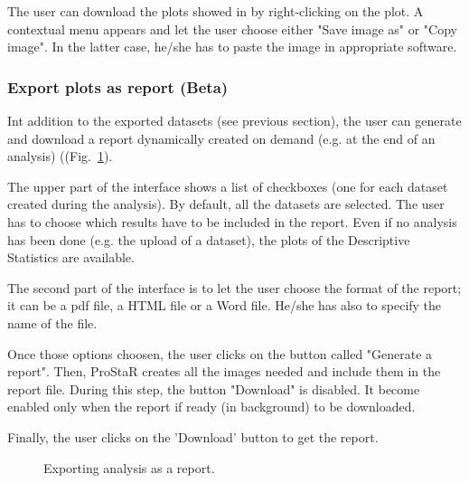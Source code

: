 \documentclass[12pt]{article}
\begin{document}
{{The user can download the plots showed in  by 
right-clicking on the plot. A contextual menu appears and let the user 
choose either "Save image as" or "Copy image". In the latter case, he/she has 
to paste the image in appropriate software.}

\subsubsection{Export plots as report (Beta)}\label{sec:Report}
Int addition to the exported datasets (see previous section), the user can generate and download a report dynamically created on demand (e.g. at the end of an analysis) ((Fig.~\ref{fig:exportReport}).

The upper part of the interface shows a list of checkboxes (one for each dataset created during the analysis). By default, all the datasets are selected.
The user has to choose which results have to be included in the report.
Even if no analysis has been done (e.g. the upload of a dataset), the plots of the Descriptive Statistics are available.

The second part of the interface is to let the user choose the format of the report; it can be a pdf file, a HTML file or a Word file. He/she has also to specify the name of the file.

Once those options choosen, the user clicks on the button called "Generate a report". Then, ProStaR creates all the images needed and include them in the report file. During this step, the button "Download" is disabled. It become enabled only when the report if ready (in background) to be downloaded.

Finally, the user clicks on the 'Download' button to get the report.

\begin {figure}
\centering
{}
\caption{Exporting analysis as a report.}\label{fig:exportReport}
\end {figure}



}
\end{document}
